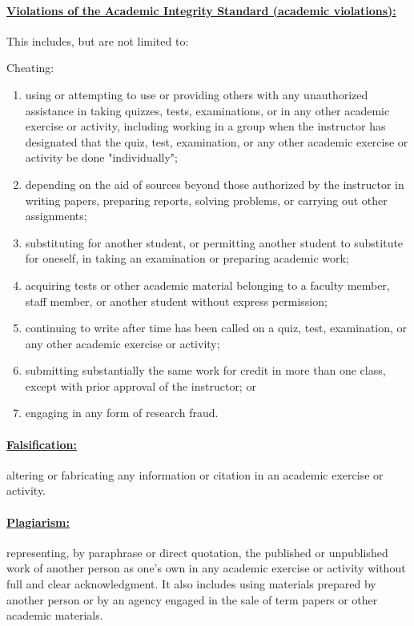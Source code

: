 \documentclass[10pt,fleqn]{article}
\begin{document}
\paragraph{\underline{Violations of the Academic Integrity Standard (academic
violations):}} This includes, but are not limited to:

\vskip0.1in\noindent
Cheating:
\vskip0.1in\noindent
\begin{enumerate}
  \item using or attempting to use or providing others with any unauthorized
        assistance in taking quizzes, tests, examinations, or in any other
        academic exercise or activity, including working in a group when the
        instructor has designated that the quiz, test, examination, or any other
        academic exercise or activity be done "individually";
  \item depending on the aid of sources beyond those authorized by the
        instructor in writing papers, preparing reports, solving problems, or
        carrying out other assignments;
  \item substituting for another student, or permitting another student to
        substitute for oneself, in taking an examination or preparing academic
        work;
  \item acquiring tests or other academic material belonging to a faculty
        member, staff member, or another student without express permission;
  \item continuing to write after time has been called on a quiz, test,
        examination, or any other academic exercise or activity;
  \item submitting substantially the same work for credit in more than one
        class, except with prior approval of the instructor; or
  \item engaging in any form of research fraud.
\end{enumerate}

\paragraph{\underline{Falsification:}} altering or fabricating any information
or citation in an academic exercise or activity.

\paragraph{\underline{Plagiarism:}} representing, by paraphrase or direct
quotation, the published or unpublished work of another person as one's own in
any academic exercise or activity without full and clear acknowledgment. It
also includes using materials prepared by another person or by an agency engaged
in the sale of term papers or other academic materials.
\end{document}
